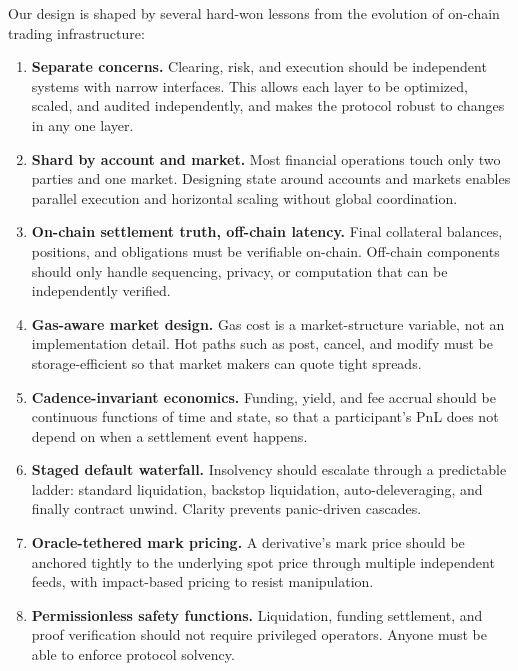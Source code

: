 \documentclass[11pt,a4paper]{article}
\begin{document}
Our design is shaped by several hard-won lessons from the evolution of on-chain trading infrastructure:

\begin{enumerate}
  \item \textbf{Separate concerns.} Clearing, risk, and execution should be independent systems with narrow interfaces. This allows each layer to be optimized, scaled, and audited independently, and makes the protocol robust to changes in any one layer.

  \item \textbf{Shard by account and market.} Most financial operations touch only two parties and one market. Designing state around accounts and markets enables parallel execution and horizontal scaling without global coordination.

  \item \textbf{On-chain settlement truth, off-chain latency.} Final collateral balances, positions, and obligations must be verifiable on-chain. Off-chain components should only handle sequencing, privacy, or computation that can be independently verified.

  \item \textbf{Gas-aware market design.} Gas cost is a market-structure variable, not an implementation detail. Hot paths such as post, cancel, and modify must be storage-efficient so that market makers can quote tight spreads.

  \item \textbf{Cadence-invariant economics.} Funding, yield, and fee accrual should be continuous functions of time and state, so that a participant's PnL does not depend on when a settlement event happens.

  \item \textbf{Staged default waterfall.} Insolvency should escalate through a predictable ladder: standard liquidation, backstop liquidation, auto-deleveraging, and finally contract unwind. Clarity prevents panic-driven cascades.

  \item \textbf{Oracle-tethered mark pricing.} A derivative's mark price should be anchored tightly to the underlying spot price through multiple independent feeds, with impact-based pricing to resist manipulation.

  \item \textbf{Permissionless safety functions.} Liquidation, funding settlement, and proof verification should not require privileged operators. Anyone must be able to enforce protocol solvency.


\end{enumerate}
\end{document}
